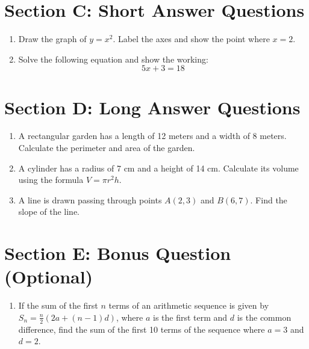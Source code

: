 \documentclass[a4paper,12pt]{article}
\begin{document}
\section*{Section C: Short Answer Questions}
\begin{enumerate}
    \item Draw the graph of $y = x^2$. Label the axes and show the point where $x = 2$.
    \item Solve the following equation and show the working: 
    \[
    5x + 3 = 18
    \]
\end{enumerate}

\section*{Section D: Long Answer Questions}
\begin{enumerate}
    \item A rectangular garden has a length of 12 meters and a width of 8 meters. Calculate the perimeter and area of the garden.
    \item A cylinder has a radius of 7 cm and a height of 14 cm. Calculate its volume using the formula $V = \pi r^2 h$.
    \item A line is drawn passing through points $A(2, 3)$ and $B(6, 7)$. Find the slope of the line.
\end{enumerate}

\section*{Section E: Bonus Question (Optional)}
\begin{enumerate}
    \item If the sum of the first $n$ terms of an arithmetic sequence is given by $S_n = \frac{n}{2}(2a + (n-1) d)$, where $a$ is the first term and $d$ is the common difference, find the sum of the first 10 terms of the sequence where $a = 3$ and $d = 2$.
\end{enumerate}
\end{document}
